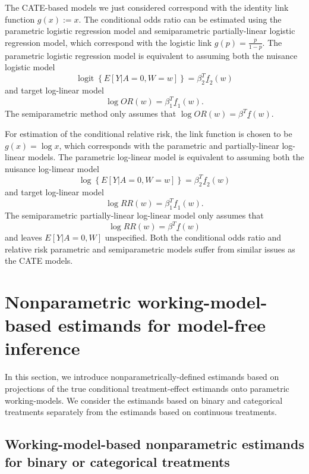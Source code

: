 \documentclass[
]{jss}
\DeclareMathOperator{\logit}{logit}
\begin{document}
The CATE-based models we just considered correspond with the identity
link function \(g(x) := x\). The conditional odds ratio can be estimated
using the parametric logistic regression model and semiparametric
partially-linear logistic regression model, which correspond with the
logistic link \(g(p) = \frac{p}{1-p}\). The parametric logistic
regression model is equivalent to assuming both the nuisance logistic
model
\[\logit \left\{ E[Y|A=0,W=w] \right\} =  \beta_2^T \underline{f}_2(w) \]
and target log-linear model
\[\log OR(w) = \beta_1^T \underline{f}_1(w).\] The semiparametric method
only assumes that \(\log OR(w) = \beta^T \underline{f}(w).\)

\noindent For estimation of the conditional relative risk, the link
function is chosen to be \(g(x) = \log x\), which corresponds with the
parametric and partially-linear log-linear models. The parametric
log-linear model is equivalent to assuming both the nuisance log-limear
model
\[\log \left\{ E[Y|A=0,W=w] \right\} =  \beta_2^T \underline{f}_2(w) \]
and target log-linear model
\[\log RR(w) = \beta_1^T \underline{f}_1(w).\] The semiparametric
partially-linear log-linear model only assumes that
\[\log RR(w) = \beta^T \underline{f}(w)\] and leaves \(E[Y|A=0,W]\)
unspecified. Both the conditional odds ratio and relative risk
parametric and semiparametric models suffer from similar issues as the
CATE models.

\section{Nonparametric working-model-based estimands for model-free inference}

In this section, we introduce nonparametrically-defined estimands based
on projections of the true conditional treatment-effect estimands onto
parametric working-models. We consider the estimands based on binary and
categorical treatments separately from the estimands based on continuous
treatments.

\subsection{Working-model-based nonparametric estimands for binary or categorical treatments}\label{section::estimandNPcat}
\end{document}
